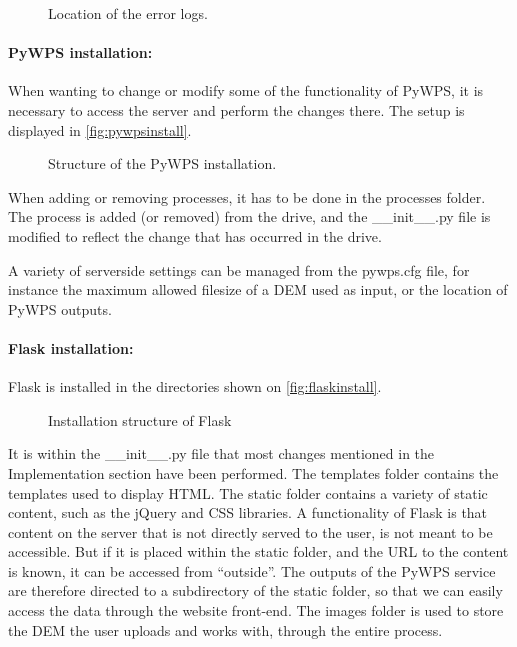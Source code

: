 \begin{figure}[h!]
\caption{Location of the error logs.}
\label{fig:anal_struct}
\end{figure}

\paragraph{PyWPS installation:} When wanting to change or modify some of the functionality of PyWPS, it is necessary to access the server and perform the changes there. The setup is displayed in \autoref{fig:pywpsinstall}. 

\begin{figure}[h!]
\caption{Structure of the PyWPS installation.}
\label{fig:pywpsinstall}
\end{figure}

When adding or removing processes, it has to be done in the processes folder. The process is added (or removed) from the drive, and the \_\_init\_\_.py file is modified to reflect the change that has occurred in the drive.

A variety of serverside settings can be managed from the pywps.cfg file, for instance the maximum allowed filesize of a DEM used as input, or the location of PyWPS outputs.

\paragraph{Flask installation:}Flask is installed in the directories shown on \autoref{fig:flaskinstall}.\\

\begin{figure}[h!]
\caption{Installation structure of Flask}
\label{fig:flaskinstall}
\end{figure}

It is within the \_\_init\_\_.py file that most changes mentioned in the Implementation section have been performed. The templates folder contains the templates used to display HTML. The static folder contains a variety of static content, such as the jQuery and CSS libraries. A functionality of Flask is that content on the server that is not directly served to the user, is not meant to be accessible. But if it is placed within the static folder, and the URL to the content is known, it can be accessed from “outside”. The outputs of the PyWPS service are therefore directed to a subdirectory of the static folder, so that we can easily access the data through the website front-end.
The images folder is used to store the DEM the user uploads and works with, through the entire process.\\

